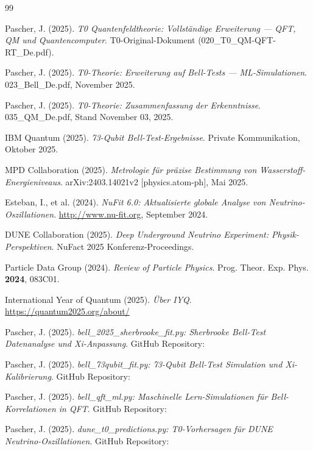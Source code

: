 	\begin{thebibliography}{99}
		
		Pascher, J. (2025). \textit{T0 Quantenfeldtheorie: Vollständige Erweiterung — QFT, QM und Quantencomputer}.
		T0-Original-Dokument (020\_T0\_QM-QFT-RT\_De.pdf).
		
		Pascher, J. (2025). \textit{T0-Theorie: Erweiterung auf Bell-Tests — ML-Simulationen}.
		023\_Bell\_De.pdf, November 2025.
		
		Pascher, J. (2025). \textit{T0-Theorie: Zusammenfassung der Erkenntnisse}.
		035\_QM\_De.pdf, Stand November 03, 2025.
		
		IBM Quantum (2025). \textit{73-Qubit Bell-Test-Ergebnisse}.
		Private Kommunikation, Oktober 2025.
		
		MPD Collaboration (2025). \textit{Metrologie für präzise Bestimmung von Wasserstoff-Energieniveaus}.
		arXiv:2403.14021v2 [physics.atom-ph], Mai 2025.
		
		Esteban, I., et al. (2024). \textit{NuFit 6.0: Aktualisierte globale Analyse von Neutrino-Oszillationen}.
		\url{http://www.nu-fit.org}, September 2024.
		
		DUNE Collaboration (2025). \textit{Deep Underground Neutrino Experiment: Physik-Perspektiven}.
		NuFact 2025 Konferenz-Proceedings.
		
		Particle Data Group (2024). \textit{Review of Particle Physics}.
		Prog. Theor. Exp. Phys. \textbf{2024}, 083C01.
		
		International Year of Quantum (2025). \textit{Über IYQ}.
		\url{https://quantum2025.org/about/}

			Pascher, J. (2025). \textit{bell\_2025\_sherbrooke\_fit.py: Sherbrooke Bell-Test Datenanalyse und Xi-Anpassung}.
			GitHub Repository: 
			
			Pascher, J. (2025). \textit{bell\_73qubit\_fit.py: 73-Qubit Bell-Test Simulation und Xi-Kalibrierung}.
			GitHub Repository: 
			
			Pascher, J. (2025). \textit{bell\_qft\_ml.py: Maschinelle Lern-Simulationen für Bell-Korrelationen in QFT}.
			GitHub Repository: 
			
			Pascher, J. (2025). \textit{dune\_t0\_predictions.py: T0-Vorhersagen für DUNE Neutrino-Oszillationen}.
			GitHub Repository: 
			

\end{thebibliography}

